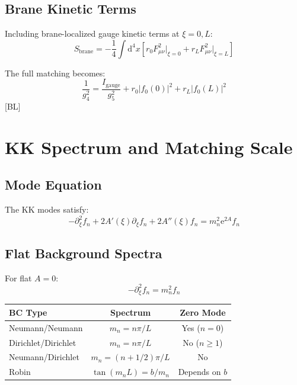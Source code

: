 \documentclass[11pt,a4paper]{article}
\newcommand{\dd}{\mathrm{d}}
\newcommand{\ee}{\mathrm{e}}
\begin{document}
\subsection{Brane Kinetic Terms}

Including brane-localized gauge kinetic terms at $\xi = 0, L$:
\begin{equation}
S_{\text{brane}} = -\frac{1}{4}\int \dd^4x\left[r_0 F_{\mu\nu}^2\big|_{\xi=0} + r_L F_{\mu\nu}^2\big|_{\xi=L}\right]
\label{eq:brane-kinetic}
\end{equation}

The full matching becomes:
\begin{equation}
\frac{1}{g_4^2} = \frac{I_{\text{gauge}}}{g_5^2} + r_0 |f_0(0)|^2 + r_L |f_0(L)|^2
\label{eq:full-matching}
\end{equation}
[BL]

\section{KK Spectrum and Matching Scale}
\label{sec:kk-spectrum}

\subsection{Mode Equation}

The KK modes satisfy:
\begin{equation}
-\partial_\xi^2 f_n + 2A'(\xi)\partial_\xi f_n + 2A''(\xi) f_n = m_n^2 \ee^{2A} f_n
\label{eq:kk-mode-eq}
\end{equation}

\subsection{Flat Background Spectra}

For flat $A = 0$:
\begin{equation}
-\partial_\xi^2 f_n = m_n^2 f_n
\label{eq:flat-mode}
\end{equation}

\begin{center}
\begin{tabular}{lcc}
\toprule
BC Type & Spectrum & Zero Mode \\
\midrule
Neumann/Neumann & $m_n = n\pi/L$ & Yes ($n=0$) \\
Dirichlet/Dirichlet & $m_n = n\pi/L$ & No ($n \geq 1$) \\
Neumann/Dirichlet & $m_n = (n+1/2)\pi/L$ & No \\
Robin & $\tan(m_n L) = b/m_n$ & Depends on $b$ \\
\bottomrule
\end{tabular}
\end{center}
\end{document}
